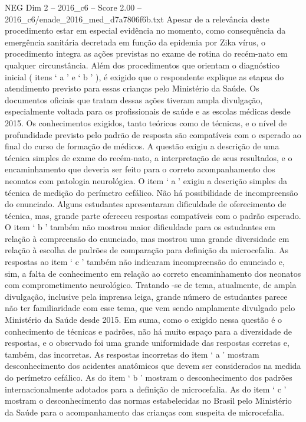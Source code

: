\begin{textsample}{NEG Dim 2 – 2016\_c6 – Score 2.00 – 2016\_c6/enade\_2016\_med\_d7a7806f6b.txt}
Apesar de a relevância deste procedimento estar em especial evidência no momento, como consequência da emergência sanitária decretada em função da epidemia por Zika vírus, o procedimento integra as ações previstas no exame de rotina do recém-nato em qualquer circunstância.
Além dos procedimentos que orientam o diagnóstico inicial ( itens ‘ a ’ e ‘ b ’ ), é exigido que o respondente explique as etapas do atendimento previsto para essas crianças pelo Ministério da Saúde.
Os documentos oficiais que tratam dessas ações tiveram ampla divulgação, especialmente voltada para os profissionais de saúde e as escolas médicas desde 2015.
Os conhecimentos exigidos, tanto teóricos como de técnicas, e o nível de profundidade previsto pelo padrão de resposta são compatíveis com o esperado ao final do curso de formação de médicos.
A questão exigiu a descrição de uma técnica simples de exame do recém-nato, a interpretação de seus resultados, e o encaminhamento que deveria ser feito para o correto acompanhamento dos neonatos com patologia neurológica.
O item ‘ a ’ exigiu a descrição simples da técnica de medição do perímetro cefálico.
Não há possibilidade de incompreensão do enunciado.
Alguns estudantes apresentaram dificuldade de oferecimento de técnica, mas, grande parte ofereceu respostas compatíveis com o padrão esperado.
O item ‘ b ’ também não mostrou maior dificuldade para os estudantes em relação à compreensão do enunciado, mas mostrou uma grande diversidade em relação à escolha de padrões de comparação para definição da microcefalia.
As respostas ao item ‘ c ’ também não indicaram incompreensão do enunciado e, sim, a falta de conhecimento em relação ao correto encaminhamento dos neonatos com comprometimento neurológico.
Tratando -se de tema, atualmente, de ampla divulgação, inclusive pela imprensa leiga, grande número de estudantes parece não ter familiaridade com esse tema, que vem sendo amplamente divulgado pelo Ministério da Saúde desde 2015.
Em suma, como o exigido nessa questão é o conhecimento de técnicas e padrões, não há muito espaço para a diversidade de respostas, e o observado foi uma grande uniformidade das respostas corretas e, também, das incorretas.
As respostas incorretas do item ‘ a ’ mostram desconhecimento dos acidentes anatômicos que devem ser considerados na medida do perímetro cefálico.
As do item ‘ b ’ mostram o desconhecimento dos padrões internacionalmente adotados para a definição de microcefalia.
As do item ‘ c ’ mostram o desconhecimento das normas estabelecidas no Brasil pelo Ministério da Saúde para o acompanhamento das crianças com suspeita de microcefalia.

\end{textsample}
